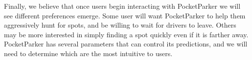 \begin{comment}
Access to historical data will also address a present fundamental limitation:
the situation of a lot that fills abruptly, a typical occurrence at
universities during class changes. Basing a negative recommendation about a
particular lot's availability solely upon recently acquired unsuccessful
searches implies that a time lag necessarily exists between when users start
discovering on their own that a lot is full and when we have collected enough
data to conclude---somewhat belatedly---that a lot is an unwise option.
Having historical data on hand will dissolve this limitation immediately:
using previous trends, we will be able to time parking advisories for
particular lots before they hit capacity.
\end{comment}

Finally, we believe that once users begin interacting with PocketParker we
will see different preferences emerge. Some user will want PocketParker to
help them aggressively hunt for spots, and be willing to wait for drivers to
leave. Others may be more interested in simply finding a spot quickly even if
it is farther away. PocketParker has several parameters that can control its
predictions, and we will need to determine which are the most intuitive to
users.

%
%
%
%
%
%
%
